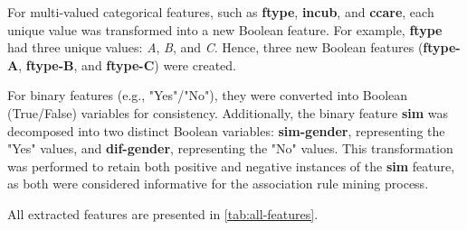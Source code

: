 For multi-valued categorical features, such as \textbf{ftype}, \textbf{incub},
and \textbf{ccare}, each unique value was transformed into a new Boolean 
feature. For example, \textbf{ftype} had three unique values: \emph{A}, \emph{B}, 
and \emph{C}. Hence, three new Boolean features (\textbf{ftype-A}, \textbf{ftype-B}, 
and \textbf{ftype-C}) were created.

For binary features (e.g., "Yes"/"No"), they were converted into Boolean (True/False)
variables for consistency. Additionally, the binary feature \textbf{sim} was decomposed
into two distinct Boolean variables: \textbf{sim-gender}, representing the "Yes" values,
and \textbf{dif-gender}, representing the "No" values. This transformation was performed
to retain both positive and negative instances of the \textbf{sim} feature, as both were
considered informative for the association rule mining process.

All extracted features are presented in \autoref{tab:all-features}.
